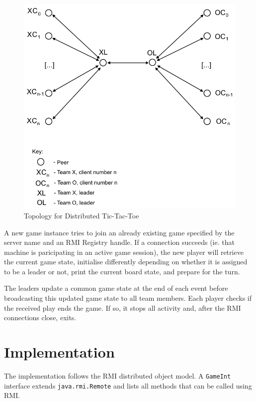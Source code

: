 \documentclass[conference]{IEEEtran}
\begin{document}
\begin{figure}[h]
	\includegraphics[width=\linewidth]{images/DAS-topology.png}
	\caption{Topology for Distributed Tic-Tac-Toe}
	\label{fig:topology1}
\end{figure}

A new game instance tries to join an already existing game specified
by the server name and an RMI Registry handle. If a connection
succeeds (ie. that machine is paricipating in an active game session),
the new player will retrieve the current game state, initialise
differently depending on whether it is assigned to be a leader or not, print the current board state, and prepare for the turn.

The leaders update a common game state at the end of each event before
broadcasting this updated game state to all team members. Each player
checks if the received play ends the game. If so, it stops all
activity and, after the RMI connections close, exits.

\section{Implementation} %

The implementation follows the RMI distributed object model. A
\texttt{GameInt} interface extends \texttt{java.rmi.Remote} and lists
all methods that can be called using RMI.
\end{document}
